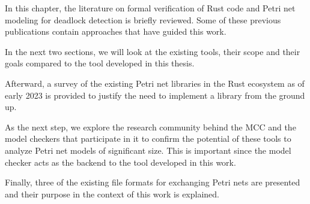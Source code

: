 In this chapter, the literature on formal verification of Rust code
and Petri net modeling for deadlock detection is briefly reviewed.
Some of these previous publications contain approaches
that have guided this work.

In the next two sections, we will look at the existing tools,
their scope and their goals compared to the tool developed in this thesis.

Afterward, a survey of the existing Petri net libraries in the Rust ecosystem
as of early 2023 is provided to justify the need to implement a library
from the ground up.

As the next step, we explore the research community behind the \acrfull{MCC}
and the model checkers that participate in it
to confirm the potential of these tools
to analyze Petri net models of significant size.
This is important since the model checker acts
as the backend to the tool developed in this work.

Finally, three of the existing file formats for exchanging Petri nets are presented
and their purpose in the context of this work is explained.